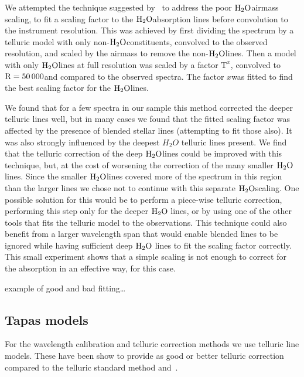 We attempted the technique suggested by~\citet{bertaux_tapas_2014} to address the poor \(\rm H_{2}O\)airmass scaling, to fit a scaling factor to the \(\rm {H}_{2}O\)absorption lines before convolution to the instrument resolution. This was achieved by first dividing the spectrum by a telluric model with only non-\(\rm H_{2}O\)constituents, convolved to the observed resolution, and scaled by the airmass to remove the non-\(\rm H_{2}O\)lines. Then a model with only \(\rm H_{2}O\)lines at full resolution was scaled by a factor \(\textrm{T}^{x}\), convolved to \(\rm R=50\,000\)and compared to the observed spectra. The factor \(x\)was fitted to find the best scaling factor for the \(\rm H_{2}O\)lines.

We found that for a few spectra in our sample this method corrected the deeper telluric lines well, but in many cases we found that the fitted scaling factor was affected by the presence of blended stellar lines (attempting to fit those also). It was also strongly influenced by the deepest \(H_{2}O\) telluric lines present. We find that the telluric correction of the deep \(\rm H_{2}O\)lines could be improved with this technique, but, at the cost of worsening the correction of the many smaller \(\rm H_{2}O\)lines. Since the smaller \(\rm H_{2}O\)lines covered more of the spectrum in this region than the larger lines we chose not to continue with this separate \(\rm H_{2}O\)scaling. One possible solution for this would be to perform a piece-wise telluric correction, performing this step only for the deeper \(\rm H_{2}O\) lines, or by using one of the other tools that fits the telluric model to the observations. This technique could also benefit from a larger wavelength span that would enable blended lines to be ignored while having sufficient deep \(\rm H_{2}O\) lines to fit the scaling factor correctly. This small experiment shows that a simple scaling is not enough to correct for the absorption in an effective way, for this case.



 example of good and bad fitting\ldots


\subsection{Tapas models}
\label{subsec:tapas_models_usage}
For the wavelength calibration and telluric correction methods we use telluric line models. These have been show to provide as good or better telluric correction compared to the telluric standard method and~\citep{ulmer-moll_telluric_2018}.


